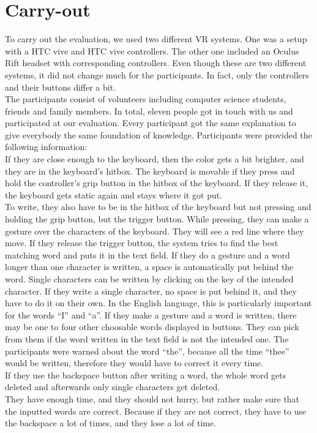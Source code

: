 \section{Carry-out}
To carry out the evaluation, we used two different VR systems. One was a setup with a HTC vive and HTC vive controllers. The other one included an Oculus Rift headset with corresponding controllers. Even though these are two different systems, it did not change much for the participants. In fact, only the controllers and their buttons differ a bit.\\
The participants consist of volunteers including computer science students, friends and family members. In total, eleven people got in touch with us and participated at our evaluation. Every participant got the same explanation to give everybody the same foundation of knowledge.
Participants were provided the following information:\\
If they are close enough to the keyboard, then the color gets a bit brighter, and they are in the keyboard's hitbox. The keyboard is movable if they press and hold the controller's grip button in the hitbox of the keyboard. If they release it, the keyboard gets static again and stays where it got put.\\
To write, they also have to be in the hitbox of the keyboard but not pressing and holding the grip button, but the trigger button. While pressing, they can make a gesture over the characters of the keyboard. They will see a red line where they move. If they release the trigger button, the system tries to find the best matching word and puts it in the text field. If they do a gesture and a word longer than one character is written, a space is automatically put behind the word. Single characters can be written by clicking on the key of the intended character. If they write a single character, no space is put behind it, and they have to do it on their own. In the English language, this is particularly important for the words ``I'' and ``a''. If they make a gesture and a word is written, there may be one to four other choosable words displayed in buttons. They can pick from them if the word written in the text field is not the intended one. The participants were warned about the word ``the'', because all the time ``thee'' would be written, therefore they would have to correct it every time.\\
If they use the backspace button after writing a word, the whole word gets deleted and afterwards only single characters get deleted.\\
They have enough time, and they should not hurry, but rather make sure that the inputted words are correct. Because if they are not correct, they have to use the backspace a lot of times, and they lose a lot of time.

